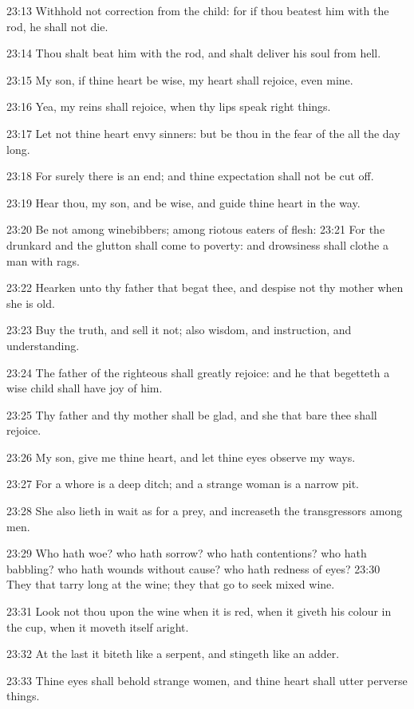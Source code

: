 23:13 Withhold not correction from the child: for if thou beatest him
with the rod, he shall not die.

23:14 Thou shalt beat him with the rod, and shalt deliver his soul
from hell.

23:15 My son, if thine heart be wise, my heart shall rejoice, even
mine.

23:16 Yea, my reins shall rejoice, when thy lips speak right things.

23:17 Let not thine heart envy sinners: but be thou in the fear of the
\LORD all the day long.

23:18 For surely there is an end; and thine expectation shall not be
cut off.

23:19 Hear thou, my son, and be wise, and guide thine heart in the
way.

23:20 Be not among winebibbers; among riotous eaters of flesh: 23:21
For the drunkard and the glutton shall come to poverty: and drowsiness
shall clothe a man with rags.

23:22 Hearken unto thy father that begat thee, and despise not thy
mother when she is old.

23:23 Buy the truth, and sell it not; also wisdom, and instruction,
and understanding.

23:24 The father of the righteous shall greatly rejoice: and he that
begetteth a wise child shall have joy of him.

23:25 Thy father and thy mother shall be glad, and she that bare thee
shall rejoice.

23:26 My son, give me thine heart, and let thine eyes observe my ways.

23:27 For a whore is a deep ditch; and a strange woman is a narrow
pit.

23:28 She also lieth in wait as for a prey, and increaseth the
transgressors among men.

23:29 Who hath woe? who hath sorrow? who hath contentions? who hath
babbling? who hath wounds without cause? who hath redness of eyes?
23:30 They that tarry long at the wine; they that go to seek mixed
wine.

23:31 Look not thou upon the wine when it is red, when it giveth his
colour in the cup, when it moveth itself aright.

23:32 At the last it biteth like a serpent, and stingeth like an
adder.

23:33 Thine eyes shall behold strange women, and thine heart shall
utter perverse things.

